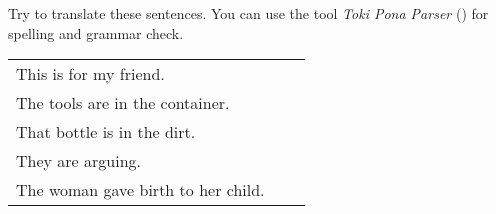Try to translate these sentences.
You can use the tool \textit{Toki Pona Parser} (\cite{www:rowa:02}) for spelling and grammar check.

\begin{supertabular}{p{5,5cm}|ll}
    This is for my friend.             &  & \\ %
    The tools are in the container.    &  & \\ %
    That bottle is in the dirt.        &  & \\ %
    They are arguing.                  &  & \\ %
    The woman gave birth to her child. &  & \\ %
\end{supertabular}

%
